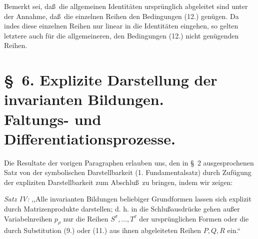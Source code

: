 Bemerkt sei, da\ss\ die allgemeinen Identit\"aten urspr\"unglich abgeleitet sind unter der Annahme, da\ss\ die einzelnen Reihen den Bedingungen (12.) gen\"ugen. Da indes diese einzelnen Reihen nur linear in die Identit\"aten eingehen, so gelten letztere auch f\"ur die allgemeineren, den Bedingungen (12.) nicht gen\"ugenden Reihen.

\section*{\S\ 6. Explizite Darstellung der invarianten Bildungen.\\Faltungs- und Differentiationsprozesse.}
Die Resultate der vorigen Paragraphen erlauben uns, den in \S\ 2 ausgesprochenen Satz von der symbolischen Darstellbarkeit (1. Fundamentalsatz) durch Zuf\"ugung der expliziten Darstellbarkeit zum Abschlu\ss\ zu bringen, indem wir zeigen:

\emph{Satz IV:} ,,Alle invarianten Bildungen beliebiger Grundformen lassen sich explizit durch Matrizenprodukte darstellen; d. h. in die Schlu\ss{}ausdr\"ucke gehen au\ss er Variabelnreihen $p_\rho$ nur die Reihen $S^\sigma,\ldots,T^\tau$ der urspr\"unglichen Formen oder die durch Substitution (9.) oder (11.) aus ihnen abgeleiteten Reihen $P,Q,R$ ein.``

